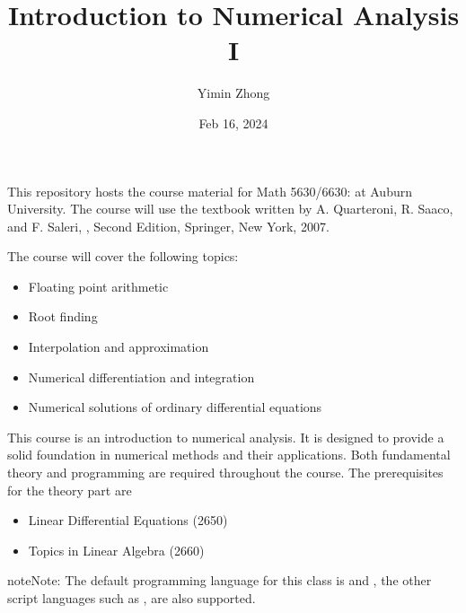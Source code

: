 \documentclass[letterpaper,10pt,english]{jupyterBook}
\title{Introduction to Numerical Analysis I}
\date{Feb 16, 2024}
\author{Yimin Zhong}
\begin{document}
\pagestyle{empty}
\sphinxmaketitle
\pagestyle{plain}
\sphinxtableofcontents
\pagestyle{normal}
\label{\detokenize{index::doc}}


\sphinxAtStartPar
This repository hosts the course material for Math 5630/6630:  at Auburn University. The course will use the textbook written by A. Quarteroni, R. Saaco, and F. Saleri, , Second Edition, Springer, New York, 2007.

\sphinxAtStartPar
The course will cover the following topics:
\begin{itemize}
\item {} 
\sphinxAtStartPar
Floating point arithmetic

\item {} 
\sphinxAtStartPar
Root finding

\item {} 
\sphinxAtStartPar
Interpolation and approximation

\item {} 
\sphinxAtStartPar
Numerical differentiation and integration

\item {} 
\sphinxAtStartPar
Numerical solutions of ordinary differential equations

\end{itemize}

\sphinxAtStartPar
This course is an introduction to numerical analysis. It is designed to provide a solid foundation in numerical methods and their applications.   Both fundamental theory and programming are required throughout the course. The prerequisites for the theory part are
\begin{itemize}
\item {} 
\sphinxAtStartPar
Linear Differential Equations (2650)

\item {} 
\sphinxAtStartPar
Topics in Linear Algebra (2660)

\end{itemize}

\begin{sphinxadmonition}{note}{Note:}
\sphinxAtStartPar
The default programming language for this class is  and , the other script languages such as ,  are also supported.
\end{sphinxadmonition}
\end{document}
